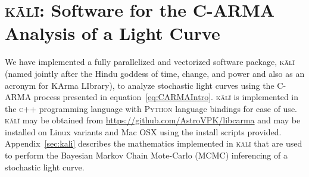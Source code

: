 \documentclass[a4paper,fleqn,usenatbib]{mnras}
\begin{document}



\section[\textsc{k\={a}l\={i}}]{\textsc{k\={a}l\={i}}: Software for the C-ARMA Analysis of a Light Curve}\label{sec:Steps}

We have implemented a fully parallelized and vectorized software package, \textsc{k\={a}l\={i}} (named jointly after the Hindu goddess of time, change, and power and also as an acronym for KArma LIbrary), to analyze stochastic light curves using the C-ARMA process presented in equation~\eqref{eq:CARMAIntro}. \textsc{k\={a}l\={i}} is implemented in the \textsc{c++} programming language with \textsc{Python} language bindings for ease of use. \textsc{k\={a}l\={i}} may be obtained from \url{https://github.com/AstroVPK/libcarma} and may be installed on Linux variants and Mac OSX using the install scripts provided. Appendix~\ref{sec:kali} describes the mathematics implemented in \textsc{k\={a}l\={i}} that are used to perform the Bayesian Markov Chain Mote-Carlo (MCMC) inferencing of a stochastic light curve.
\end{document}
